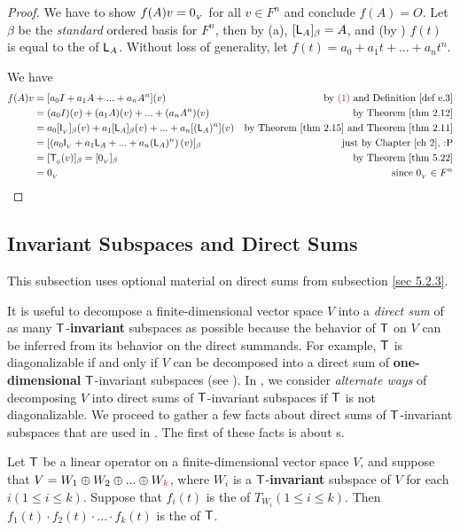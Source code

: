\begin{proof}
We have to show \(f(A) v = 0_{_V}\) for all \(v \in F^n\) and conclude \(f(A) = O\).
Let \(\beta\) be the \emph{standard} ordered basis for \(F^n\), then by (a), \([\textsf{L}_A]_{\beta} = A\), and (by ) \(f(t)\) is equal to the \CPOLY{} of \(\textsf{L}_A\).
Without loss of generality, let \(f(t) = a_0 + a_1 t + ... + a_n t^n\). 

We have
\begin{align*}
    f(A) v & = [a_0 I + a_1 A + ... + a_n A^n](v) & \text{by \MAROON{(1)} and \DEF{e.3}} \\
           & = (a_0 I)(v) + (a_1 A)(v) + ... + (a_n A^n)(v) & \text{by \THM{2.12}} \\
           & = a_0 [\ITRANV{}]_{\beta} (v) + a_1 [\LMTRAN_A]_{\beta} (v) + ... + a_n [(\LMTRAN_A)^n] (v) & \text{by \THM{2.15} and \THM{2.11}} \\
           & = [\left( a_0 \ITRANV{} + a_1 \LMTRAN_A + ... + a_n (\LMTRAN_A)^n \right) (v)]_{\beta} & \text{just by \CH{2}, :P} \\
           & = [\TZERO(v)]_{\beta} = [\OV]_{\beta} & \text{by \THM{5.22}} \\
           & = \OV & \text{since \(\OV \in F^n\)}
\end{align*}
\end{proof}

\subsection{Invariant Subspaces and Direct Sums} \label{sec 5.4.2}
This subsection uses optional material on direct sums from subsection \ref{sec 5.2.3}.

It is useful to decompose a finite-dimensional vector space \(V\) into a \emph{direct sum} of as many \(\textsf{T}\)-\textbf{invariant} subspaces as possible because the behavior of \(\textsf{T}\) on \(V\) can be inferred from its behavior on the direct summands.
For example, \(\textsf{T}\) is diagonalizable if and only if \(V\) can be decomposed into a direct sum of \textbf{one-dimensional} \(\textsf{T}\)-invariant subspaces (see ).
In , we consider \emph{alternate ways} of decomposing \(V\) into direct sums of \(\textsf{T}\)-invariant subspaces if \(\textsf{T}\) is not diagonalizable.
We proceed to gather a few facts about direct sums of \(\textsf{T}\)-invariant subspaces that are used in .
The first of these facts is about \CPOLY{}s.

\begin{theorem} \label{thm 5.23}
Let \(\textsf{T}\) be a linear operator on a finite-dimensional vector space \(V\), and suppose that \(V = W_1 \oplus W_2 \oplus ... \oplus W_{\RED{k}}\), where \(W_i\) is a \(\textsf{T}\)-\textbf{invariant} subspace of \(V\) for each \(i (1 \le i \le k)\).
Suppose that \(f_i(t)\) is the \CPOLY{} of \(T_{W_i} (1 \le i \le k)\).
Then \(f_1(t) \cdot f_2(t) \cdot ... \cdot f_k(t)\) is the \CPOLY{} of \(\textsf{T}\).
\end{theorem}

